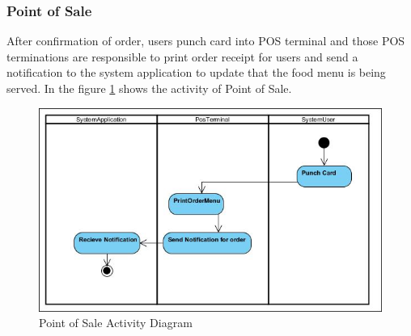 \subsubsection{Point of Sale} After confirmation of order, users punch card into
POS terminal and those POS terminations are responsible to print order receipt
for users and send a notification to the system application to update that the
food menu is being served. In the figure \ref{PointofSaleActivity} shows the
activity of Point of Sale.

\begin{figure}[h!t]
    \centering
      \includegraphics[width=5.5in]{ch3/ActivityDiagram/POS}
  \caption{Point of Sale Activity Diagram}
  \label{PointofSaleActivity}
\end{figure}